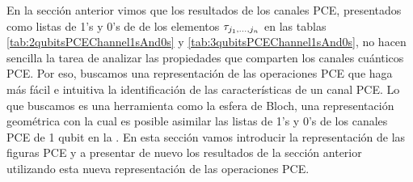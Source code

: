 En la sección anterior vimos que los resultados de los canales PCE,
presentados como listas de 1's y 0's 
de de los elementos $\tau_{j_1,\ldots ,j_n}$ en las tablas \ref{tab:2qubitsPCEChannel1sAnd0s} y 
\ref{tab:3qubitsPCEChannel1sAnd0s}, no hacen sencilla la tarea de analizar 
las propiedades que comparten los canales cuánticos PCE. Por eso, 
buscamos una representación de las operaciones PCE que haga más fácil 
e intuitiva la identificación de las características de un canal PCE. 
Lo que buscamos es una herramienta como la esfera de Bloch, 
una representación geométrica con la cual es posible asimilar las listas 
de 1's y 0's de los canales PCE de 1 qubit en la .  
En esta sección vamos introducir la representación de las figuras PCE 
y a presentar de nuevo los resultados de la sección anterior 
utilizando esta nueva representación de las operaciones PCE.



